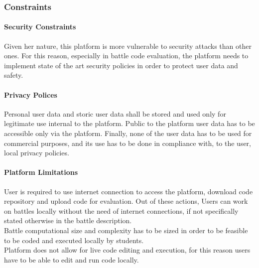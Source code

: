 \subsubsection{Constraints}
\paragraph{Security Constraints}
Given her nature, this platform is more vulnerable to security attacks than other ones. For this reason, especially in battle code evaluation, the platform needs to implement state of the art security policies in order to protect user data and safety.
\paragraph{Privacy Polices}
Personal user data and storic user data shall be stored and used only for legitimate use internal to the platform. Public to the platform user data has to be accessible only via the platform. Finally, none of the user data has to be used for commercial purposes, and its use has to be done in compliance with, to the user, local privacy policies. 
\paragraph{Platform Limitations}
User is required to use internet connection to access the platform, download code repository and upload code for evaluation. Out of these actions, Users can work on battles locally without the need of internet connections, if not specifically stated otherwise in the battle description.\\
Battle computational size and complexity has to be sized in order to be feasible to be coded and executed locally by students.\\
Platform does not allow for live code editing and execution, for this reason users have to be able to edit and run code locally.
